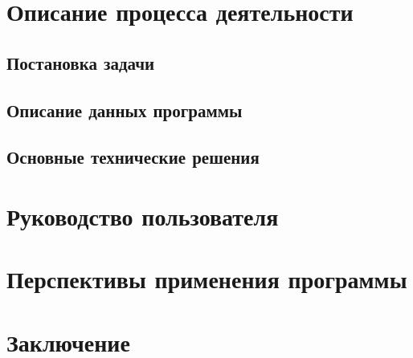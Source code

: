 \section{Описание процесса деятельности} 
\setcounter{figure}{0}

\subsection{Постановка задачи}

\subsection{Описание данных программы}

\subsection{Основные технические решения}


\section{Руководство пользователя}
\setcounter{figure}{0}

\section{Перспективы применения программы}
\setcounter{figure}{0}

\section{Заключение}
\setcounter{figure}{0}

% 
% 
% 



